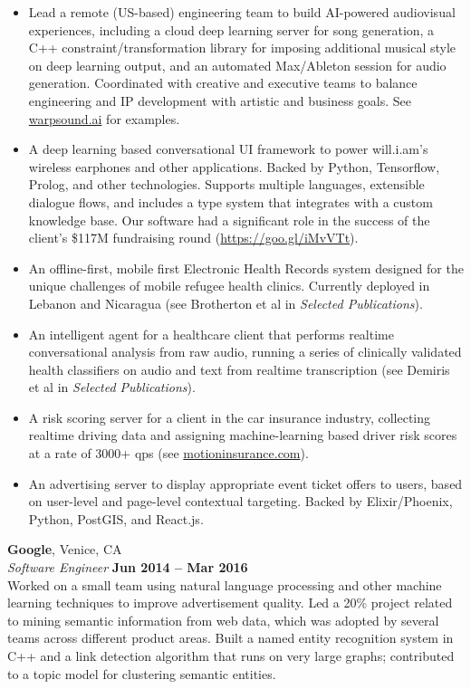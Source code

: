 \documentclass[margin,line]{resume}
\begin{document}
\begin{resume}
    \begin{itemize}
    \item Lead a remote (US-based) engineering team to build AI-powered audiovisual
      experiences, including a cloud deep learning server for song generation, a
      C++ constraint/transformation library for imposing additional musical style
      on deep learning output, and an automated Max/Ableton session for audio
      generation. Coordinated with creative and executive teams to balance
      engineering and IP development with artistic and business goals. See
      \url{warpsound.ai} for examples.
    \item A deep learning based conversational UI framework to power
      will.i.am's wireless earphones and other applications. Backed by Python,
      Tensorflow, Prolog, and other technologies. Supports multiple languages,
      extensible dialogue flows, and includes a type system that integrates with
      a custom knowledge base. Our software had a significant role in the
      success of the client's \$117M fundraising round (\url{https://goo.gl/iMvVTt}).
    \item An offline-first, mobile first Electronic Health Records system
      designed for the unique challenges of mobile refugee health clinics.
      Currently deployed in Lebanon and Nicaragua (see Brotherton et al in
      \emph{Selected Publications}).
    \item An intelligent agent for a healthcare client that performs realtime
      conversational analysis from raw audio, running a series of clinically
      validated health classifiers on audio and text from realtime transcription
      (see Demiris et al in \emph{Selected Publications}).
    \item A risk scoring server for a client in the car insurance industry,
      collecting realtime driving data and assigning machine-learning based
      driver risk scores at a rate of 3000+ qps (see \url{motioninsurance.com}).
    \item An advertising server to display appropriate event ticket offers
      to users, based on user-level and page-level contextual targeting. Backed
      by Elixir/Phoenix, Python, PostGIS, and React.js.
    \end{itemize}

    \pagebreak

    \textbf{Google}, Venice, CA \vspace{2mm}\\\vspace{1mm}%
    \textsl{Software Engineer} \hfill \textbf{Jun 2014 -- Mar 2016}\\
    Worked on a small team using natural language processing and other machine
    learning techniques to improve advertisement quality. Led a 20\% project
    related to mining semantic information from web data, which was adopted by
    several teams across different product areas. Built a named entity
    recognition system in C++ and a link detection algorithm that runs on very
    large graphs; contributed to a topic model for clustering semantic entities.


\end{resume}
\end{document}
